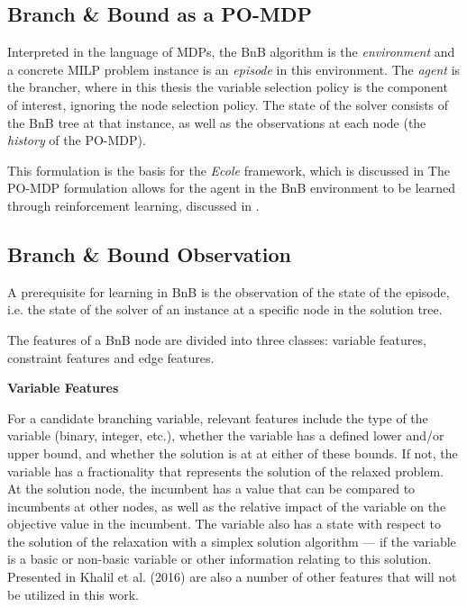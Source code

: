 \subsection{Branch \& Bound as a PO-MDP}\label{ssec:pomdp}

Interpreted in the language of \gls{MDP}s, the \gls{BnB} algorithm is the \textit{environment} and a concrete \gls{MILP} problem instance is an \textit{episode} in this environment. The \textit{agent} is the brancher, where in this thesis the variable selection policy is the component of interest, ignoring the node selection policy. The state of the solver consists of the \gls{BnB} tree at that instance, as well as the observations at each node (the \textit{history} of the \gls{PO-MDP}).

This formulation is the basis for the \textit{Ecole} framework, which is discussed in 
The \gls{PO-MDP} formulation allows for the agent in the \gls{BnB} environment to be learned through reinforcement learning, discussed in .



\subsection{Branch \& Bound Observation}\label{ssec:obs}

A prerequisite for learning in \gls{BnB} is the observation of the state of the episode, i.e. the state of the solver of an instance at a specific node in the solution tree. 


The features of a \gls{BnB} node are divided into three classes: variable features, constraint features and edge features.


\textbf{Variable Features}

For a candidate branching variable, relevant features include the type of the variable (binary, integer, etc.), whether the variable has a defined lower and/or upper bound, and whether the solution is at at either of these bounds.  
If not, the variable has a fractionality that represents the solution of the relaxed problem.
At the solution node, the incumbent has a value that can be compared to incumbents at other nodes, as well as the relative impact of the variable on the objective value in the incumbent. 
The variable also has a state with respect to the solution of the relaxation with a simplex solution algorithm --- if the variable is a basic or non-basic variable or other information relating to this solution.
Presented in Khalil et al. (2016) \cite{khalil2016learning} are also a number of other features that will not be utilized in this work.




